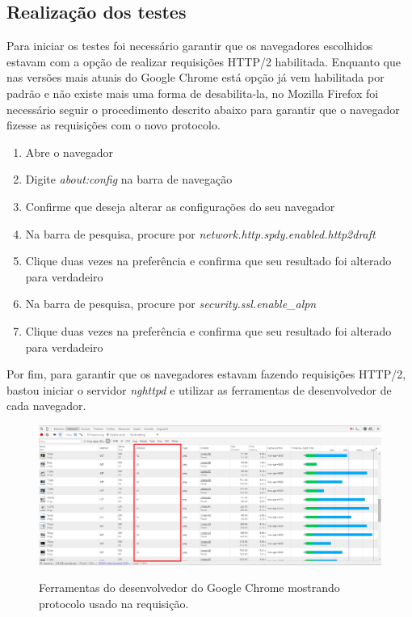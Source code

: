 \subsection{Realização dos testes}
\label{realizacaodostestes}

Para iniciar os testes foi necessário garantir que os navegadores escolhidos estavam com a opção de realizar requisições HTTP/2 habilitada. Enquanto que nas versões mais atuais do Google Chrome está opção já vem habilitada por padrão e não existe mais uma forma de desabilita-la, no Mozilla Firefox foi necessário seguir o procedimento descrito abaixo para garantir que o navegador fizesse as requisições com o novo protocolo.

\begin{enumerate}
	\item Abre o navegador
	\item Digite \textit{about:config} na barra de navegação
	\item Confirme que deseja alterar as configurações do seu navegador
	\item Na barra de pesquisa, procure por \textit{network.http.spdy.enabled.http2draft}
	\item Clique duas vezes na preferência e confirma que seu resultado foi alterado para verdadeiro
	\item Na barra de pesquisa, procure por \textit{security.ssl.enable\_alpn}
	\item Clique duas vezes na preferência e confirma que seu resultado foi alterado para verdadeiro	
\end{enumerate}

Por fim, para garantir que os navegadores estavam fazendo requisições HTTP/2, bastou iniciar o servidor \textit{nghttpd} e utilizar as ferramentas de desenvolvedor de cada navegador.

\begin{figure}[!htb]
    \centering
    \caption{Ferramentas do desenvolvedor do Google Chrome mostrando protocolo usado na requisição.}
    \includegraphics[width=1.0\textwidth]{./04-figuras/desenvolvimento/http2_chrome}
    \label{fig:httpcontenttype2011}
\end{figure}

